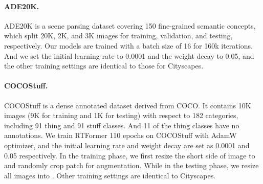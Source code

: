 \documentclass{article}
\begin{document}
\vspace{-2mm}
\paragraph{ADE20K.}
ADE20K\cite{ADE20K} is a scene parsing dataset covering 150 fine-grained semantic concepts, which split 20K, 2K, and 3K images for training, validation, and testing, respectively. Our models are trained with a batch size of 16 for 160k iterations. And we set the initial learning rate to 0.0001 and the weight decay to 0.05, and the other training settings are identical to those for Cityscapes\cite{Cityscapes}.

\vspace{-2mm}
\paragraph{COCOStuff.}
COCOStuff\cite{caesar2018coco} is a dense annotated dataset derived from COCO. It contains 10K images (9K for training and 1K for testing) with respect to 182 categories, including 91 thing and 91 stuff classes. And 11 of the thing classes have no annotations. We train RTFormer 110 epochs on COCOStuff with AdamW optimizer, and the initial learning rate and weight decay are set as 0.0001 and 0.05 respectively. In the training phase, we first resize the short side of image to  and randomly crop  patch for augmentation. While in the testing phase, we resize all images into . Other training settings are identical to Cityscapes.
\end{document}
